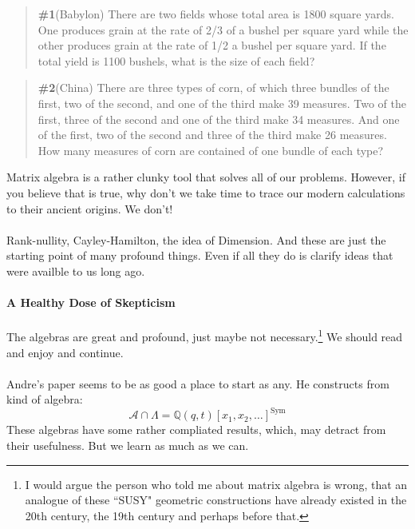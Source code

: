 \documentclass[12pt]{article}
\begin{document}
\begin{quotation}\textbf{\#1}(Babylon) There are two fields whose total area is 1800 square yards. One produces grain at the rate of 2/3 of a bushel per square yard while the other produces grain at the rate of 1/2 a bushel per square yard. If the total yield is 1100 bushels, what is the size of each field?
\end{quotation}
\begin{quotation}\textbf{\#2}(China) There are three types of corn, of which three bundles of the first, two of the second, and one of the third make 39 measures. Two of the first, three of the second and one of the third make 34 measures. And one of the first, two of the second and three of the third make 26 measures. How many measures of corn are contained of one bundle of each type?
\end{quotation}
\vspace{12pt}Matrix algebra is a rather clunky tool that solves all of our problems.  However, if you believe that is true, why don't we take time to trace our modern calculations to their ancient origins.  We don't!  \\ \\
Rank-nullity, Cayley-Hamilton, the idea of Dimension.  And these are just the starting point of many profound things.  Even if all they do is clarify ideas that were availble to us long ago. \\ \\
\textbf{A Healthy Dose of Skepticism} \\ \\
The algebras are great and profound, just maybe not necessary.\footnote{I would argue the person who told me about matrix algebra is wrong, that an analogue of these ``SUSY" geometric constructions have already existed in the 20th century, the 19th century and perhaps before that.} We should read and enjoy and continue. \\ \\
Andre's paper seems to be as good a place to start as any.  He constructs from kind of algebra:
$$ \mathcal{A} \cap \Lambda = \mathbb{Q}(q,t)[x_1, x_2, \dots]^{\text{Sym}} $$
These algebras have some rather compliated results, which, may detract from their usefulness.  But we learn as much as we can.

\vfill
\end{document}

